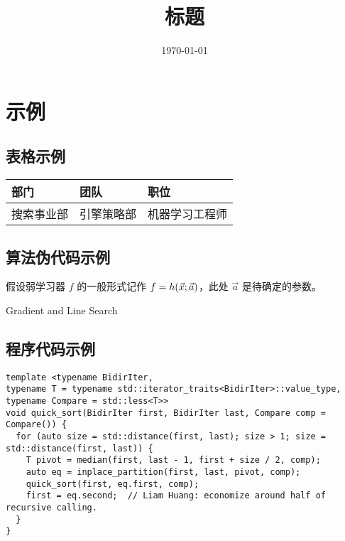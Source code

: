 \documentclass[UTF8, zihao = 5]{article}
\title{标题}
\author{\authorname}
\date{\today}
\begin{document}
\makefrontpage
{}  %

\section{示例}
\subsection{表格示例}

\begin{tabu} to \linewidth{X[1,c]X[2,c]X[1.5,c]}
\toprule
部门 & 团队 & 职位 \\
\midrule
搜索事业部 & 引擎策略部 & 机器学习工程师 \\
\bottomrule
\end{tabu}

\clp  %

\subsection{算法伪代码示例}

假设弱学习器 $f$ 的一般形式记作 $f = h(\vec{x}; \vec a)$，此处 $\vec a$ 是待确定的参数。

\begin{algorithm}[!htbp]
  \scriptsize
  \caption{Gradient and Line Search}\label{alg:GALS}
  \begin{algorithmic}[1]
      \EndFor
    \EndProcedure
  \end{algorithmic}
\end{algorithm}

\clp  %

\subsection{程序代码示例}

\begin{lstlisting}[style = lcpp, caption = {快速排序主函数}]
template <typename BidirIter,
typename T = typename std::iterator_traits<BidirIter>::value_type,
typename Compare = std::less<T>>
void quick_sort(BidirIter first, BidirIter last, Compare comp = Compare()) {
  for (auto size = std::distance(first, last); size > 1; size = std::distance(first, last)) {
    T pivot = median(first, last - 1, first + size / 2, comp);
    auto eq = inplace_partition(first, last, pivot, comp);
    quick_sort(first, eq.first, comp);
    first = eq.second;  // Liam Huang: economize around half of recursive calling.
  }
}
\end{lstlisting}
\end{document}
